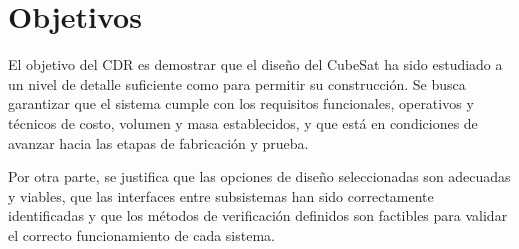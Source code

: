\chapter{Objetivos}

El objetivo del CDR es demostrar que el diseño del CubeSat ha sido estudiado a un nivel de detalle suficiente como para
permitir su construcción. Se busca garantizar que el sistema cumple con los requisitos funcionales, operativos y
técnicos de costo, volumen y masa establecidos, y que está en condiciones de avanzar hacia las etapas de fabricación y
prueba.

Por otra parte, se justifica que las opciones de diseño seleccionadas son adecuadas y viables, que las interfaces entre
subsistemas han sido correctamente identificadas y que los métodos de verificación definidos son factibles para validar
el correcto funcionamiento de cada sistema.
